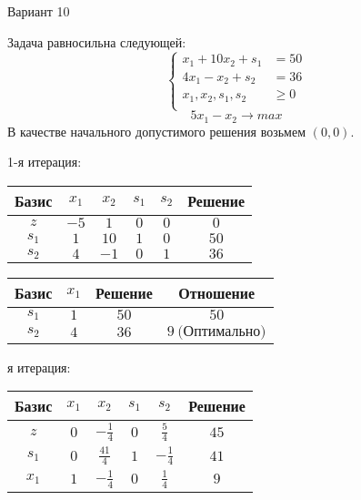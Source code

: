 \documentclass{article}%
\begin{document}
\newpage%
\begin{center}%
\begin{Huge}%
Вариант 10%
\end{Huge}%
\end{center}%
Задача равносильна следующей: %
\[%
\left\{\begin{aligned}x_{1}+10x_{2}+s_{1} & =50 \\4x_{1}-x_{2}+s_{2} & =36 \\x_{1},x_{2},s_{1},s_{2} & \ge 0 \\ \end{aligned}\right.%
\]%
\[%
5x_{1}-x_{2}  \to max%
\]%
В качестве начального допустимого решения возьмем %
$(0, 0).$%
\begin{flushleft}%
1{-}я итерация: %
\newline%
\newline%
\renewcommand{\arraystretch}{1.3}%
\begin{tabular}{|c|cccc|c|}%
\hline%
Базис&$x_{1}$&$x_{2}$&$s_{1}$&$s_{2}$&Решение\\%
\hline%
$z$&$-5$&$1$&$0$&$0$&$0$\\%
\hline%
$s_{1}$&$1$&$10$&$1$&$0$&$50$\\%
$s_{2}$&$4$&$-1$&$0$&$1$&$36$\\%
\hline%
\end{tabular}%
\newline%
\newline%
\newline%
\begin{tabular}{|cccc|}%
\hline%
Базис&$x_{1}$&Решение&Отношение\\%
\hline%
$s_{1}$&$1$&$50$&$50$\\%
$s_{2}$&$4$&$36$&$9\: \text{(Оптимально)}$\\%
\hline%
\end{tabular}%
\newline%
\newline%
я итерация: %
\newline%
\newline%
\renewcommand{\arraystretch}{1.3}%
\begin{tabular}{|c|cccc|c|}%
\hline%
Базис&$x_{1}$&$x_{2}$&$s_{1}$&$s_{2}$&Решение\\%
\hline%
$z$&$0$&$-\frac{1}{4}$&$0$&$\frac{5}{4}$&$45$\\%
\hline%
$s_{1}$&$0$&$\frac{41}{4}$&$1$&$-\frac{1}{4}$&$41$\\%
$x_{1}$&$1$&$-\frac{1}{4}$&$0$&$\frac{1}{4}$&$9$\\%

\end{tabular}
\end{flushleft}
\end{document}
